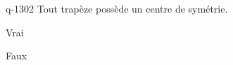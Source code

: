 \begin{truefalse}{q-1302}
Tout trapèze possède un centre de symétrie.
\item Vrai
\item* Faux
\end{truefalse}

